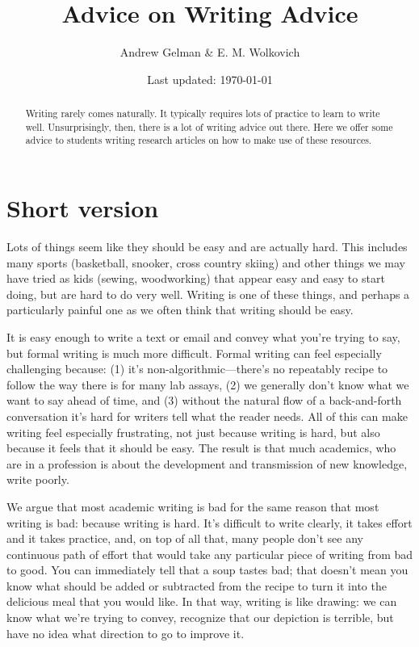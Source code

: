 \documentclass[11pt,letter]{article}
\begin{document}


\title{Advice on Writing Advice}
\author{Andrew Gelman  \& E. M. Wolkovich}
\date{Last updated: \today}
\maketitle

\begin{abstract}
Writing rarely comes naturally. It typically requires lots of practice to learn to write well.  Unsurprisingly, then, there is a lot of writing advice out there. Here we offer some advice to students writing research articles on how to make use of these resources. 
\end{abstract}

\section{Short version}

Lots of things seem like they should be easy and are actually hard. This includes many sports (basketball, snooker, cross country skiing) and other things we may have tried as kids (sewing, woodworking) that appear easy and easy to start doing, but are hard to do very well. Writing is one of these things, and perhaps a particularly painful one as we often think that writing should be easy. 

It is easy enough to write a text or email and convey what you’re trying to say, but formal writing is much more difficult. Formal writing can feel especially challenging because: (1) it's non-algorithmic---there's no repeatably recipe to follow the way there is for many lab assays, (2) we generally don't know what we want to say ahead of time, and (3) without the natural flow of a back-and-forth conversation it's hard for writers tell what the reader needs. All of this can make writing feel especially frustrating, not just because writing is hard, but also because it feels that it should be easy. The result is that much academics, who are in a profession is about the development and transmission of new knowledge, write poorly. 

We argue that most academic writing is bad for the same reason that most writing is bad: because writing is hard.  It’s difficult to write clearly, it takes effort and it takes practice, and, on top of all that, many people don’t see any continuous path of effort that would take any particular piece of writing from bad to good.  You can immediately tell that a soup tastes bad; that doesn’t mean you know what should be added or subtracted from the recipe to turn it into the delicious meal that you would like.  In that way, writing is like drawing:  we can know what we’re trying to convey, recognize that our depiction is terrible, but have no idea what direction to go to improve it.
\end{document}
